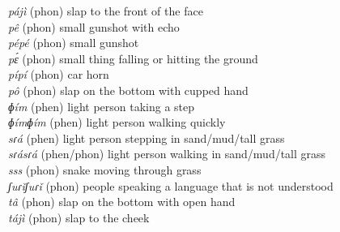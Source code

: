 \documentclass[output=paper,colorlinks,citecolor=brown]{langscibook}
\begin{document}
\begin{tabbing}
\textit{pájì}                               \>(phon) slap to the front of the face                                                                    \\
\textit{pê}                                \>(phon) small gunshot with echo                                                                          \\
\textit{pépé}                               \>(phon) small gunshot                                                                                    \\
\textit{pɛ́}                                  \>(phon) small thing falling or hitting the ground                                                                              \\
\textit{pípí}                    \>(phon) car horn                                                                                         \\
\textit{pô}                                \>(phon) slap on the bottom with cupped hand                                                              \\
\textit{ɸím}                                 \>(phen) light person taking a step                                                                           \\
\textit{ɸímɸím}                             \>(phen) light person walking quickly                                                                         \\
\textit{sɾá}                                 \>(phen) light person stepping in sand/mud/tall grass                                                      \\
\textit{sɾásɾá}                             \>(phen/phon) light person walking in sand/mud/tall grass                                                  \\
\textit{sss}                                  \>(phon) snake moving through grass                                                                                      \\
\textit{ʃuɾǐʃuɾǐ}                           \>(phon) people speaking a language that is not understood                                         \\
\textit{tâ}                                \>(phon) slap on the bottom with open hand                                                                \\
\textit{tájì}                               \>(phon) slap to the cheek                                                                                \\

\end{tabbing}
\end{document}
